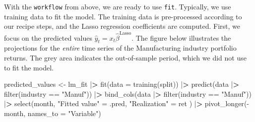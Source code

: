 \documentclass[
]{book}
\newenvironment{Shaded}{\begin{snugshade}}{\end{snugshade}}
\newcommand{\AttributeTok}[1]{\textcolor[rgb]{0.61,0.61,0.61}{#1}}
\newcommand{\ErrorTok}[1]{\textcolor[rgb]{0.14,0.14,0.14}{\textbf{#1}}}
\newcommand{\FunctionTok}[1]{\textcolor[rgb]{0,0,0}{#1}}
\newcommand{\NormalTok}[1]{#1}
\newcommand{\OtherTok}[1]{\textcolor[rgb]{0.37,0.37,0.37}{#1}}
\newcommand{\SpecialCharTok}[1]{\textcolor[rgb]{0,0,0}{#1}}
\newcommand{\StringTok}[1]{\textcolor[rgb]{0.5,0.5,0.5}{#1}}
\begin{document}
With the \texttt{workflow} from above, we are ready to use \texttt{fit}. Typically, we use training data to fit the model.
The training data is pre-processed according to our recipe steps, and the Lasso regression coefficients are computed.
First, we focus on the predicted values \(\hat{y}_t = x_t\hat\beta^\text{Lasso}.\) The figure below illustrates the projections for the \emph{entire} time series of the Manufacturing industry portfolio returns. The grey area indicates the out-of-sample period, which we did not use to fit the model.

\begin{Shaded}
\begin{Highlighting}[]
\NormalTok{predicted\_values }\OtherTok{\textless{}{-}}\NormalTok{ lm\_fit }\SpecialCharTok{|}\ErrorTok{\textgreater{}}
  \FunctionTok{fit}\NormalTok{(}\AttributeTok{data =} \FunctionTok{training}\NormalTok{(split)) }\SpecialCharTok{|}\ErrorTok{\textgreater{}}
  \FunctionTok{predict}\NormalTok{(data }\SpecialCharTok{|}\ErrorTok{\textgreater{}} \FunctionTok{filter}\NormalTok{(industry }\SpecialCharTok{==} \StringTok{"Manuf"}\NormalTok{)) }\SpecialCharTok{|}\ErrorTok{\textgreater{}}
  \FunctionTok{bind\_cols}\NormalTok{(data }\SpecialCharTok{|}\ErrorTok{\textgreater{}} \FunctionTok{filter}\NormalTok{(industry }\SpecialCharTok{==} \StringTok{"Manuf"}\NormalTok{)) }\SpecialCharTok{|}\ErrorTok{\textgreater{}}
  \FunctionTok{select}\NormalTok{(month,}
    \StringTok{"Fitted value"} \OtherTok{=}\NormalTok{ .pred,}
    \StringTok{"Realization"} \OtherTok{=}\NormalTok{ ret}
\NormalTok{  ) }\SpecialCharTok{|}\ErrorTok{\textgreater{}}
  \FunctionTok{pivot\_longer}\NormalTok{(}\SpecialCharTok{{-}}\NormalTok{month, }\AttributeTok{names\_to =} \StringTok{"Variable"}\NormalTok{)}


\end{Highlighting}
\end{Shaded}
\end{document}
